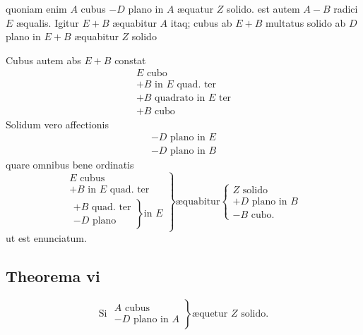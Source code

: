 \documentclass[11pt,a4paper]{article}
\begin{document}
quoniam enim $A$ cubus $- D$ plano in $A$ æquatur $Z$ solido. est autem $A - B$ radici $E$ æqualis. Igitur $E + B$ æquabitur $A$ itaq; cubus ab $E + B$ multatus solido ab $D$ plano in $E + B$ æquabitur $Z$ solido

Cubus autem abs $E + B$ constat
\[ \begin{array}{l} E \text{ cubo} \\ + B \text{ in } E \text{ quad. ter} \\ + B \text{ quadrato in } E \text{ ter} \\ + B \text{ cubo} \end{array} \]
Solidum vero affectionis
\[ \begin{array}{l} - D \text{ plano in } E \\ - D \text{ plano in } B \end{array} \]
quare omnibus bene ordinatis
\[ \left.\begin{array}{l} E \text{ cubus} \\ + B \text{ in } E \text{ quad. ter} \\ \left.\begin{array}{l} + B \text{ quad. ter} \\ - D \text{ plano} \end{array}\right\} \text{in } E \end{array}\right\} \text{æquabitur} \left\{\begin{array}{l} Z \text{ solido} \\ + D \text{ plano in } B \\ - B \text{ cubo.} \end{array}\right. \]
ut est enunciatum.

\subsection*{Theorema vi}

\[ \text{Si } \left.\begin{array}{l} A \text{ cubus} \\ - D \text{ plano in } A \end{array}\right\} \text{æquetur } Z \text{ solido.} \]

\end{document}
